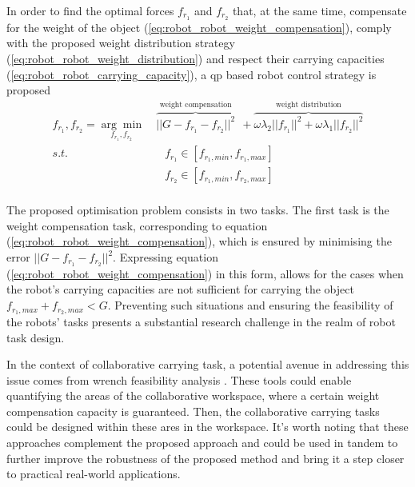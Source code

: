 In order to find the optimal forces $f_{r_1}$ and $f_{r_2}$ that, at the same time, compensate for the weight of the object (\ref{eq:robot_robot_weight_compensation}), comply with the proposed weight distribution strategy (\ref{eq:robot_robot_weight_distribution}) and respect their carrying capacities (\ref{eq:robot_robot_carrying_capacity}), a \gls{qp} based robot control strategy is proposed
\begin{equation}
\begin{split}
    f_{r_1}, f_{r_2} = \underset{f_{r_1},f_{r_2}}{\arg\min} &~\overbrace{||G - f_{r_1} -f_{r_2}||^2}^{\text{weight compensation}} ~~+ \overbrace{ \omega\lambda_2||f_{r_1}||^2 + \omega\lambda_1||f_{r_2}||^2}^{\text{weight distribution}}\\
    s.t.& \quad f_{r_1} \in[f_{r_1,min}, f_{r_1,max}]\\
    & \quad f_{r_2} \in[f_{r_1,min}, f_{r_2,max}]\\
\end{split}
\label{eq:qp_robot_robot}
\end{equation}

The proposed optimisation problem consists in two tasks. The first task is the weight compensation task, corresponding to equation (\ref{eq:robot_robot_weight_compensation}), which is ensured by minimising the error $||G - f_{r_1} -f_{r_2}||^2$. Expressing equation (\ref{eq:robot_robot_weight_compensation}) in this form, allows for the cases when the robot's carrying capacities are not sufficient for carrying the object $f_{r_1,max} + f_{r_2,max}<G$. Preventing such situations and ensuring the feasibility of the robots' tasks presents a substantial research challenge in the realm of robot task design. 

In the context of collaborative carrying task, a potential avenue in addressing this issue comes from wrench feasibility analysis \cite{gouttefarde2006determination,Lau2011}. These tools could enable quantifying the areas of the collaborative workspace, where a certain weight compensation capacity is guaranteed. Then, the collaborative carrying tasks could be designed within these ares in the workspace. It's worth noting that these approaches complement the proposed approach and could be used in tandem to further improve the robustness of the proposed method and bring it a step closer to practical real-world applications.  

